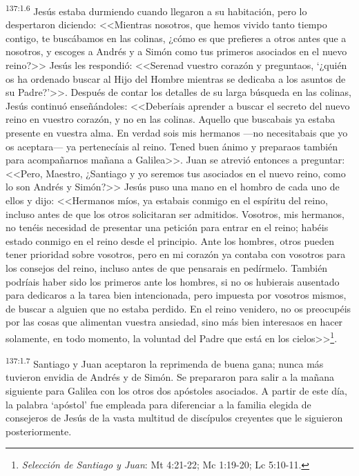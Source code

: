 \par 
\textsuperscript{137:1.6} Jesús estaba durmiendo cuando llegaron a su habitación, pero lo despertaron diciendo: <<Mientras nosotros, que hemos vivido tanto tiempo contigo, te buscábamos en las colinas, ¿cómo es que prefieres a otros antes que a nosotros, y escoges a Andrés y a Simón como tus primeros asociados en el nuevo reino?>> Jesús les respondió: <<Serenad vuestro corazón y preguntaos, `¿quién os ha ordenado buscar al Hijo del Hombre mientras se dedicaba a los asuntos de su Padre?'>>. Después de contar los detalles de su larga búsqueda en las colinas, Jesús continuó enseñándoles: <<Deberíais aprender a buscar el secreto del nuevo reino en vuestro corazón, y no en las colinas. Aquello que buscabais ya estaba presente en vuestra alma. En verdad sois mis hermanos ---no necesitabais que yo os aceptara--- ya pertenecíais al reino. Tened buen ánimo y preparaos también para acompañarnos mañana a Galilea>>. Juan se atrevió entonces a preguntar: <<Pero, Maestro, ¿Santiago y yo seremos tus asociados en el nuevo reino, como lo son Andrés y Simón?>> Jesús puso una mano en el hombro de cada uno de ellos y dijo: <<Hermanos míos, ya estabais conmigo en el espíritu del reino, incluso antes de que los otros solicitaran ser admitidos. Vosotros, mis hermanos, no tenéis necesidad de presentar una petición para entrar en el reino; habéis estado conmigo en el reino desde el principio. Ante los hombres, otros pueden tener prioridad sobre vosotros, pero en mi corazón ya contaba con vosotros para los consejos del reino, incluso antes de que pensarais en pedírmelo. También podríais haber sido los primeros ante los hombres, si no os hubierais ausentado para dedicaros a la tarea bien intencionada, pero impuesta por vosotros mismos, de buscar a alguien que no estaba perdido. En el reino venidero, no os preocupéis por las cosas que alimentan vuestra ansiedad, sino más bien interesaos en hacer solamente, en todo momento, la voluntad del Padre que está en los cielos>>\footnote{\textit{Selección de Santiago y Juan}: Mt 4:21-22; Mc 1:19-20; Lc 5:10-11.}.

\par 
\textsuperscript{137:1.7} Santiago y Juan aceptaron la reprimenda de buena gana; nunca más tuvieron envidia de Andrés y de Simón. Se prepararon para salir a la mañana siguiente para Galilea con los otros dos apóstoles asociados. A partir de este día, la palabra `apóstol' fue empleada para diferenciar a la familia elegida de consejeros de Jesús de la vasta multitud de discípulos creyentes que le siguieron posteriormente.

